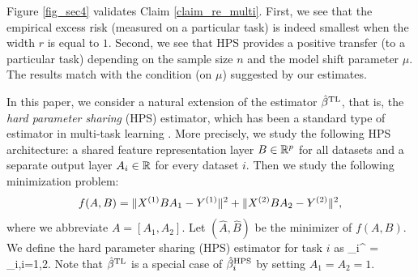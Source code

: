 Figure \ref{fig_sec4} validates Claim \ref{claim_re_multi}.
First, we see that the empirical excess risk (measured on a particular task) is indeed smallest when the width $r$ is equal to $1$.
Second, we see that HPS provides a positive transfer (to a particular task) depending on the sample size $n$ and the model shift parameter $\mu$.
The results match with the condition (on $\mu$) suggested by our estimates.













\iffalse
In this paper, we consider a natural extension of the estimator $\hat \beta^{\rm{TL}} $, that is, the \emph{hard parameter sharing} (HPS) estimator, which has been a standard type of estimator in multi-task learning . More precisely, we study the following HPS architecture: a shared feature representation layer $B\in\mathbb{R}^{p}$ for all datasets and a separate output layer $A_i \in \mathbb{R}$ for every dataset $i$. Then we study the following minimization problem:
\begin{align}\label{eq_tsl}
			f(A, B) = \norm{X^{(1)} B A_1 - Y^{(1)}}^2 + \norm{X^{(2)} B A_2 - Y^{(2)}}^2,
\end{align}
where we abbreviate $A = [A_1, A_2]$. Let $(\hat{A}, \hat{B})$ be the minimizer of $f(A, B)$. We define the hard parameter sharing (HPS) estimator for task $i$ as
\be\label{def_HPS}\hat{\beta}_i^{\MTL} =  _i,\quad i=1,2.\ee
Note that $\hat \beta^{\rm{TL}}$ is a special case of $\hat{\beta}_i^{\textup{HPS}}$ by setting $A_1=A_2=1$.


